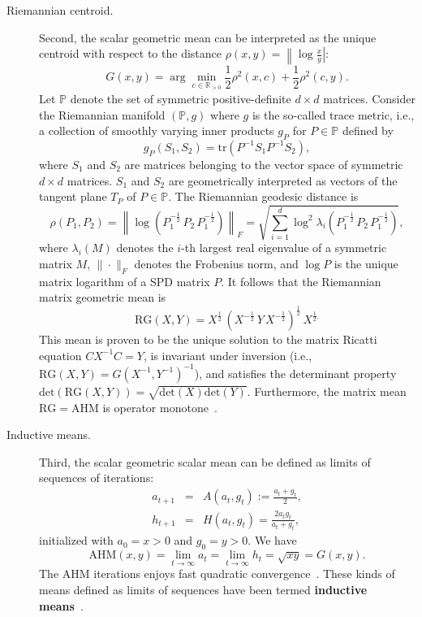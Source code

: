\documentclass{article}
\def\det{\mathrm{det}}
\def\bbR{\mathbb{R}}
\def\AHM{\mathrm{AHM}}
\def\tr{\mathrm{tr}}
\def\RGM{\mathrm{RG}}
\def\bbP{\mathbb{P}}
\begin{document}
\begin{description}
\item[Riemannian centroid.] Second, the scalar geometric mean can be interpreted as the unique centroid 
with respect to the distance $\rho(x,y)=\left\| \log\frac{x}{y} \right|$:
$$
G(x,y)=\arg\min_{c\in\bbR_{>0}} \frac{1}{2}\rho^2(x,c)+\frac{1}{2}\rho^2(c,y).
$$
Let $\bbP$ denote the set of symmetric positive-definite $d\times d$ matrices.
Consider the Riemannian manifold $(\bbP,g)$ where $g$ is the so-called trace metric,
 i.e., a collection of smoothly varying inner products $g_P$ for $P\in\bbP$ defined by
$$
g_P(S_1,S_2)=\tr\left(P^{-1} S_1 P^{-1} S_2\right),
$$ 
where $S_1$ and $S_2$ are matrices belonging to the vector space of symmetric $d\times d$ matrices.
$S_1$ and $S_2$ are geometrically interpreted as vectors  of the tangent plane $T_P$ of $P\in\bbP$.
The Riemannian geodesic distance is
$$
\rho(P_1,P_2)=\left\| \log\left(P_1^{-\frac{1}{2}}\, P_2\, P_1^{-\frac{1}{2}}\right)\right\|_F  =\sqrt{\sum_{i=1}^d \log^2 \lambda_i\left(P_1^{-\frac{1}{2}}\, P_2\, P_1^{-\frac{1}{2}}\right)},
$$
where $\lambda_i(M)$ denotes the $i$-th largest real eigenvalue of a symmetric matrix $M$, $\|\cdot\|_F$ denotes the Frobenius norm, and $\log P$ is the unique matrix logarithm of a SPD matrix $P$.
It follows that the Riemannian matrix geometric mean is
$$
\RGM(X,Y)=X^{\frac{1}{2}}\, (X^{-\frac{1}{2}}\, Y\, X^{-\frac{1}{2}})^{\frac{1}{2}}\, X^{\frac{1}{2}.}
$$
This mean is proven to be the unique solution to the matrix Ricatti equation $CX^{-1}C=Y$,
is invariant under inversion (i.e., $\RGM(X,Y)=G(X^{-1},Y^{-1})^{-1}$), 
and satisfies the determinant property $\det(\RGM(X,Y))=\sqrt{\det(X)\det(Y)}$.
Furthermore, the matrix mean $\RGM=\AHM$ is operator monotone~\cite{bhatia2012monotonicity}.

	
\item[Inductive means.] Third, the scalar geometric scalar mean can be defined 
as limits of sequences of iterations: 
\begin{eqnarray*}
a_{t+1} &=& A(a_t,g_t):=\frac{a_t+g_t}{2},\\
h_{t+1} &=& H(a_t,g_t)=\frac{2a_tg_t}{a_t+g_t},
\end{eqnarray*}
initialized with $a_0=x>0$ and $g_0=y>0$.
We have 
$$
\AHM(x,y)=\lim_{t\rightarrow\infty} a_t=\lim_{t\rightarrow\infty} h_t=\sqrt{xy}=G(x,y).
$$
The AHM iterations enjoys fast quadratic convergence~\cite{ArchimedeanDoubleSequence-1984}.
These kinds of means defined as limits of sequences have been termed {\bf inductive means}~\cite{sturm2003probability}.


\end{description}
\end{document}
